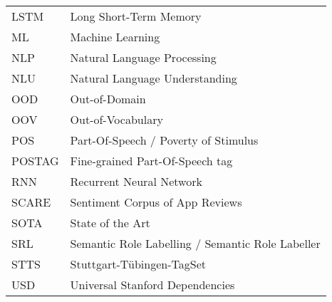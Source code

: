 \begin{supertabular}{lp{12.5cm}}
LSTM    & Long Short-Term Memory\\
ML      & Machine Learning\\
NLP     & Natural Language Processing\\
NLU     & Natural Language Understanding\\
OOD     & Out-of-Domain\\
OOV     & Out-of-Vocabulary\\
POS     & Part-Of-Speech / Poverty of Stimulus\\
POSTAG  & Fine-grained Part-Of-Speech tag\\
RNN     & Recurrent Neural Network\\
SCARE   & Sentiment Corpus of App Reviews\\
SOTA    & State of the Art\\
SRL     & Semantic Role Labelling / Semantic Role Labeller\\
STTS    & Stuttgart-Tübingen-TagSet\\
USD     & Universal Stanford Dependencies\\
\end{supertabular}

\newpage
